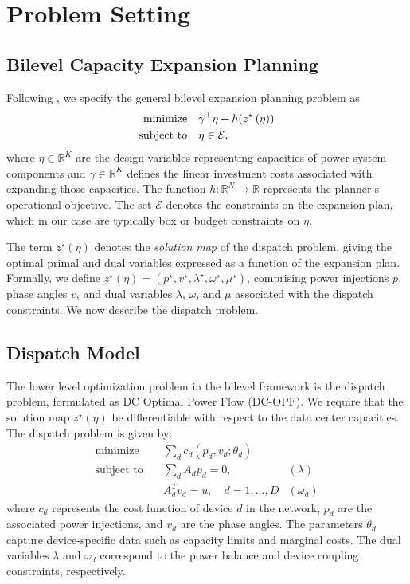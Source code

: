 \section{Problem Setting}

\subsection{Bilevel Capacity Expansion Planning}
Following \cite{degleris2024gradient}, we specify the general bilevel expansion planning problem as
\begin{equation}
\begin{aligned}
\text{minimize}\quad & \gamma^\top \eta + h(z^{\star}\left(\eta)\right) \\
\text{subject to}\quad & \eta \in \mathcal{E},
\end{aligned}
\label{eq:bilevel_problem}
\end{equation}
where $\eta \in \mathbb{R}^K$ are the design variables representing capacities of power system components and $\gamma \in \mathbb{R}^K$ defines the linear investment costs associated with expanding those capacities. The function $h: \mathbb{R}^N \to \mathbb{R}$ represents the planner's operational objective. The set $\mathcal{E}$ denotes the constraints on the expansion plan, which in our case are typically box or budget constraints on $\eta$.

The term $z^{\star}(\eta)$ denotes the \emph{solution map} of the dispatch problem, giving the optimal primal and dual variables expressed as a function of the expansion plan. Formally, we define $z^{\star}(\eta) = (p^{\star}, v^{\star}, \lambda^{\star}, \omega^{\star}, \mu^{\star})$, comprising power injections $p$, phase angles $v$, and dual variables $\lambda$, $\omega$, and $\mu$ associated with the dispatch constraints. We now describe the dispatch problem.

\subsection{Dispatch Model}
The lower level optimization problem in the bilevel framework is the dispatch problem, formulated as DC Optimal Power Flow (DC-OPF). We require that the solution map $z^{\star}(\eta)$ be differentiable with respect to the data center capacities. The dispatch problem is given by:
\begin{equation} \label{eq:dc-opf-full}
\begin{array}{llr}
    \text{minimize} \quad 
    & \sum_d c_d(p_d, v_d; \theta_{d}) \quad\\
    \text{subject to} \quad 
    & \sum_d A_d p_d = 0,
        \quad\quad & (\lambda) \\
    & A_d^T v_d = u, \quad d = 1, \ldots, D & (\omega_d)
\end{array}
\end{equation}
where $c_{d}$ represents the cost function of device $d$ in the network, $p_{d}$ are the associated power injections, and $v_{d}$ are the phase angles. The parameters $\theta_d$ capture device-specific data such as capacity limits and marginal costs. The dual variables $\lambda$ and $\omega_{d}$ correspond to the power balance and device coupling constraints, respectively.


